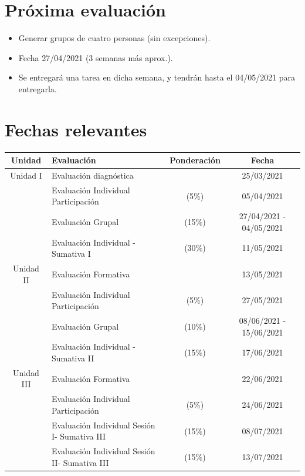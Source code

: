 \documentclass[12 pt,letterpaper]{article}
\begin{document}
\section{Próxima evaluación}

\begin{itemize}
	\item Generar grupos de cuatro personas (sin excepciones).
	
	\item Fecha 27/04/2021 (3 semanas más aprox.).
	
	\item Se entregará una tarea en dicha semana, y tendrán hasta el 04/05/2021 para entregarla. 
\end{itemize}

\section{Fechas relevantes}

\begin{center}
\begin{tabular}{|c|l|c|c|}
	\hline
	Unidad & Evaluación & Ponderación & Fecha \\
	\hline
	Unidad I & Evaluación diagnóstica & & 25/03/2021 \\
	\hline
	& Evaluación Individual Participación & (5\%) & 05/04/2021 \\
	\hline
	& Evaluación Grupal & (15\%) & 27/04/2021 - 04/05/2021 \\
	\hline
	& Evaluación Individual - Sumativa I & (30\%) & 11/05/2021 \\
	\hline
	Unidad II & Evaluación Formativa & & 13/05/2021 \\
	\hline
	& Evaluación Individual Participación & (5\%) & 27/05/2021 \\
	\hline
	& Evaluación Grupal & (10\%) & 08/06/2021 - 15/06/2021 \\
	\hline
	& Evaluación Individual - Sumativa II & (15\%) & 17/06/2021 \\
	\hline
	Unidad III & Evaluación Formativa & & 22/06/2021 \\
	\hline
	& Evaluación Individual Participación & (5\%) & 24/06/2021 \\
	\hline
	& Evaluación Individual Sesión I- Sumativa III & (15\%) & 08/07/2021 \\
	\hline
	& Evaluación Individual Sesión II- Sumativa III & (15\%) & 13/07/2021 \\
	\hline
\end{tabular}
\end{center}
\end{document}
